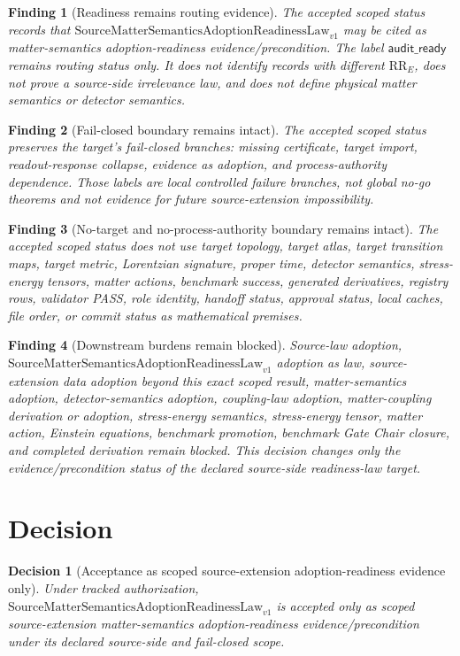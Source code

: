 \documentclass[11pt]{article}
\newcommand{\SMSAR}{\mathrm{SourceMatterSemanticsAdoptionReadinessLaw}_{v1}}
\newcommand{\AuditReady}{\mathsf{audit\_ready}}
\newtheorem{decision}{Decision}
\newtheorem{finding}{Finding}
\begin{document}
\begin{finding}[Readiness remains routing evidence]
The accepted scoped status records that \(\SMSAR\) may be cited as
matter-semantics adoption-readiness evidence/precondition. The label
\(\AuditReady\) remains routing status only. It does not identify records
with different \(\mathrm{RR}_E\), does not prove a source-side irrelevance
law, and does not define physical matter semantics or detector semantics.
\end{finding}

\begin{finding}[Fail-closed boundary remains intact]
The accepted scoped status preserves the target's fail-closed branches:
missing certificate, target import, readout-response collapse, evidence as
adoption, and process-authority dependence. Those labels are local controlled
failure branches, not global no-go theorems and not evidence for future
source-extension impossibility.
\end{finding}

\begin{finding}[No-target and no-process-authority boundary remains intact]
The accepted scoped status does not use target topology, target atlas, target
transition maps, target metric, Lorentzian signature, proper time, detector
semantics, stress-energy tensors, matter actions, benchmark success,
generated derivatives, registry rows, validator PASS, role identity, handoff
status, approval status, local caches, file order, or commit status as
mathematical premises.
\end{finding}

\begin{finding}[Downstream burdens remain blocked]
Source-law adoption, \(\SMSAR\) adoption as law, source-extension data
adoption beyond this exact scoped result, matter-semantics adoption,
detector-semantics adoption, coupling-law adoption, matter-coupling
derivation or adoption, stress-energy semantics, stress-energy tensor, matter
action, Einstein equations, benchmark promotion, benchmark Gate Chair
closure, and completed derivation remain blocked. This decision changes only
the evidence/precondition status of the declared source-side readiness-law
target.
\end{finding}

\section{Decision}

\begin{decision}[Acceptance as scoped source-extension adoption-readiness evidence only]
Under tracked authorization, \(\SMSAR\) is accepted only as scoped
source-extension matter-semantics adoption-readiness evidence/precondition
under its declared source-side and fail-closed scope.
\end{decision}
\end{document}
